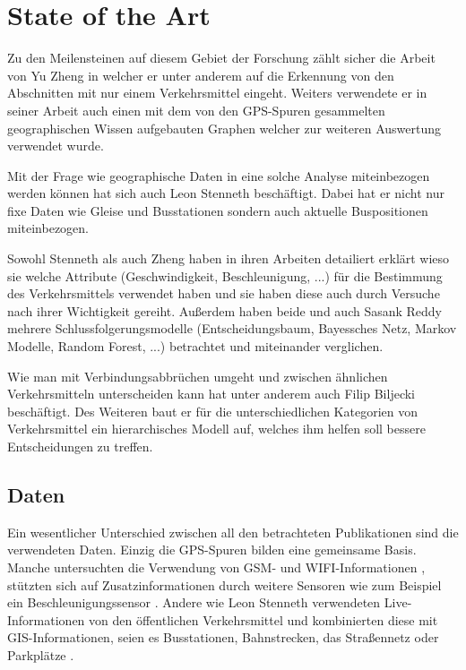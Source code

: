 \chapter{State of the Art}
Zu den Meilensteinen auf diesem Gebiet der Forschung zählt sicher die Arbeit von Yu Zheng in welcher er unter anderem auf die Erkennung von den Abschnitten mit nur einem Verkehrsmittel eingeht. Weiters verwendete er in seiner Arbeit auch einen mit dem von den GPS-Spuren gesammelten geographischen Wissen aufgebauten Graphen welcher zur weiteren Auswertung verwendet wurde.\cite{zheng_understanding_2010, zheng_understanding_2008, zheng_learning_2008}

Mit der Frage wie geographische Daten in eine solche Analyse miteinbezogen werden können hat sich auch Leon Stenneth beschäftigt. Dabei hat er nicht nur fixe Daten wie Gleise und Busstationen sondern auch aktuelle Buspositionen miteinbezogen.

Sowohl Stenneth als auch Zheng haben in ihren Arbeiten detailiert erklärt wieso sie welche Attribute (Geschwindigkeit, Beschleunigung, ...) für die Bestimmung des Verkehrsmittels verwendet haben und sie haben diese auch durch Versuche nach ihrer Wichtigkeit gereiht. Außerdem haben beide und auch Sasank Reddy \cite{reddy_determining_2008} mehrere Schlussfolgerungsmodelle (Entscheidungsbaum, Bayessches Netz, Markov Modelle, Random Forest, ...) betrachtet und miteinander verglichen. 

Wie man mit Verbindungsabbrüchen umgeht und zwischen ähnlichen Verkehrsmitteln unterscheiden kann hat unter anderem auch Filip Biljecki beschäftigt. Des Weiteren baut er für die unterschiedlichen Kategorien von Verkehrsmittel ein hierarchisches Modell auf, welches ihm helfen soll bessere Entscheidungen zu treffen. \cite{biljecki_transportation_2013}

\clearpage

\section{Daten}
Ein wesentlicher Unterschied zwischen all den betrachteten Publikationen sind die verwendeten Daten. Einzig die GPS-Spuren bilden eine gemeinsame Basis. Manche untersuchten die Verwendung von GSM- und WIFI-Informationen \cite{reddy_using_2010},  stützten sich auf Zusatzinformationen durch weitere Sensoren wie zum Beispiel ein Beschleunigungssensor \cite{reddy_using_2010, nadine_schussler_improving_2011}. Andere wie Leon Stenneth verwendeten Live-Informationen von den öffentlichen Verkehrsmittel und kombinierten diese mit GIS-Informationen, seien es Busstationen, Bahnstrecken, das Straßennetz oder Parkplätze \cite{stenneth_transportation_2011}.

